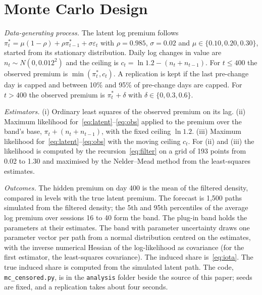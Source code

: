 \section{Monte Carlo Design}\label{app:mc}
\emph{Data-generating process.} The latent log premium follows $\pi^{*}_{t}=\mu(1-\rho)+\rho\pi^{*}_{t-1}+\sigma\varepsilon_t$ with $\rho=0.985$, $\sigma=0.02$ and $\mu\in\{0.10,0.20,0.30\}$, started from its stationary distribution. Daily log changes in value are $n_t\sim N(0,0.012^2)$ and the ceiling is $c_t=\ln 1.2-(n_t+n_{t-1})$. For $t\le 400$ the observed premium is $\min(\pi^{*}_t,c_t)$. A replication is kept if the last pre-change day is capped and between 10\% and 95\% of pre-change days are capped. For $t>400$ the observed premium is $\pi^{*}_t+\delta$ with $\delta\in\{0,0.3,0.6\}$.

\emph{Estimators.} (i) Ordinary least squares of the observed premium on its lag. (ii) Maximum likelihood for~\eqref{eq:latent}--\eqref{eq:obs} applied to the premium over the band's base, $\pi_t+(n_t+n_{t-1})$, with the fixed ceiling $\ln 1.2$. (iii) Maximum likelihood for~\eqref{eq:latent}--\eqref{eq:obs} with the moving ceiling $c_t$. For (ii) and (iii) the likelihood is computed by the recursion~\eqref{eq:filter} on a grid of 193 points from 0.02 to 1.30 and maximised by the Nelder--Mead method from the least-squares estimates.

\emph{Outcomes.} The hidden premium on day 400 is the mean of the filtered density, compared in levels with the true latent premium. The forecast is 1,500 paths simulated from the filtered density; the 5th and 95th percentiles of the average log premium over sessions 16 to 40 form the band. The plug-in band holds the parameters at their estimates. The band with parameter uncertainty draws one parameter vector per path from a normal distribution centred on the estimates, with the inverse numerical Hessian of the log-likelihood as covariance (for the first estimator, the least-squares covariance). The induced share is~\eqref{eq:iota}. The true induced share is computed from the simulated latent path. The code, \texttt{mc\_censored.py}, is in the \texttt{analysis} folder beside the source of this paper; seeds are fixed, and a replication takes about four seconds.

